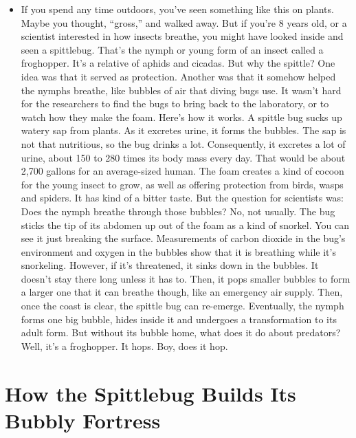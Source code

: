 \begin{itemize}
\tightlist
\item
  If you spend any time outdoors, you've seen something like this on
  plants. Maybe you thought, ``gross,'' and walked away. But if you're 8
  years old, or a scientist interested in how insects breathe, you might
  have looked inside and seen a spittlebug. That's the nymph or young
  form of an insect called a froghopper. It's a relative of aphids and
  cicadas. But why the spittle? One idea was that it served as
  protection. Another was that it somehow helped the nymphs breathe,
  like bubbles of air that diving bugs use. It wasn't hard for the
  researchers to find the bugs to bring back to the laboratory, or to
  watch how they make the foam. Here's how it works. A spittle bug sucks
  up watery sap from plants. As it excretes urine, it forms the bubbles.
  The sap is not that nutritious, so the bug drinks a lot. Consequently,
  it excretes a lot of urine, about 150 to 280 times its body mass every
  day. That would be about 2,700 gallons for an average-sized human. The
  foam creates a kind of cocoon for the young insect to grow, as well as
  offering protection from birds, wasps and spiders. It has kind of a
  bitter taste. But the question for scientists was: Does the nymph
  breathe through those bubbles? No, not usually. The bug sticks the tip
  of its abdomen up out of the foam as a kind of snorkel. You can see it
  just breaking the surface. Measurements of carbon dioxide in the bug's
  environment and oxygen in the bubbles show that it is breathing while
  it's snorkeling. However, if it's threatened, it sinks down in the
  bubbles. It doesn't stay there long unless it has to. Then, it pops
  smaller bubbles to form a larger one that it can breathe though, like
  an emergency air supply. Then, once the coast is clear, the spittle
  bug can re-emerge. Eventually, the nymph forms one big bubble, hides
  inside it and undergoes a transformation to its adult form. But
  without its bubble home, what does it do about predators? Well, it's a
  froghopper. It hops. Boy, does it hop.
\end{itemize}

\hypertarget{how-the-spittlebug-builds-its-bubbly-fortress-1}{%
\section{How the Spittlebug Builds Its Bubbly
Fortress}\label{how-the-spittlebug-builds-its-bubbly-fortress-1}}

